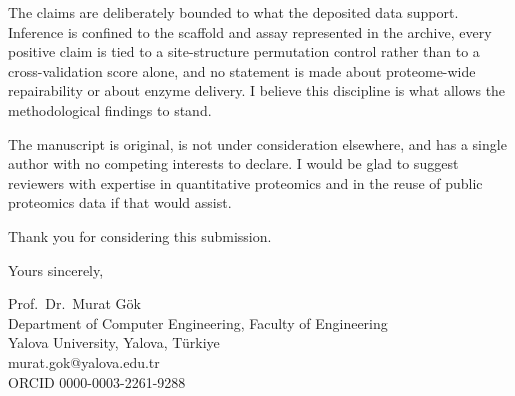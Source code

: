 \documentclass[11pt,a4paper]{letter}
\begin{document}
The claims are deliberately bounded to what the deposited data support. Inference is confined to the scaffold and assay represented in the archive, every positive claim is tied to a site-structure permutation control rather than to a cross-validation score alone, and no statement is made about proteome-wide repairability or about enzyme delivery. I believe this discipline is what allows the methodological findings to stand.

The manuscript is original, is not under consideration elsewhere, and has a single author with no competing interests to declare. I would be glad to suggest reviewers with expertise in quantitative proteomics and in the reuse of public proteomics data if that would assist.

Thank you for considering this submission.

\vspace{0.8em}
\noindent Yours sincerely,

\vspace{2.2em}
\noindent Prof.\ Dr.\ Murat Gök\\
Department of Computer Engineering, Faculty of Engineering\\
Yalova University, Yalova, Türkiye\\
murat.gok@yalova.edu.tr\\
ORCID 0000-0003-2261-9288
\end{document}
